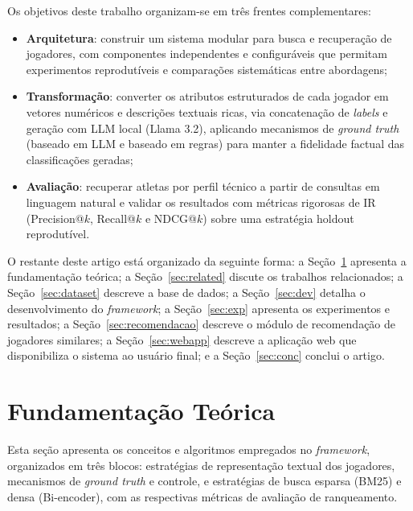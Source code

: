 \documentclass[portuguese]{sbc2025}
\begin{document}
Os objetivos deste trabalho organizam-se em três frentes complementares:

\begin{itemize}
  \item \textbf{Arquitetura}: construir um sistema modular para busca e recuperação
        de jogadores, com componentes independentes e configuráveis que permitam
        experimentos reprodutíveis e comparações sistemáticas entre abordagens;

  \item \textbf{Transformação}: converter os atributos estruturados de cada jogador
        em vetores numéricos e descrições textuais ricas, via concatenação de
        \textit{labels} e geração com LLM local (Llama 3.2), aplicando mecanismos
        de \textit{ground truth} (baseado em LLM e baseado em regras) para manter
        a fidelidade factual das classificações geradas;

  \item \textbf{Avaliação}: recuperar atletas por perfil técnico a partir de consultas
        em linguagem natural e validar os resultados com métricas rigorosas de IR
        (Precision@$k$, Recall@$k$ e NDCG@$k$) sobre uma estratégia
        holdout reprodutível.
\end{itemize}

O restante deste artigo está organizado da seguinte forma: a Seção~\ref{sec:fund}
apresenta a fundamentação teórica; a Seção~\ref{sec:related} discute os trabalhos
relacionados; a Seção~\ref{sec:dataset} descreve a base de dados; a
Seção~\ref{sec:dev} detalha o desenvolvimento do \textit{framework}; a
Seção~\ref{sec:exp} apresenta os experimentos e resultados; a
Seção~\ref{sec:recomendacao} descreve o módulo de recomendação de jogadores
similares; a Seção~\ref{sec:webapp} descreve a aplicação web que disponibiliza o
sistema ao usuário final; e a Seção~\ref{sec:conc} conclui o artigo.


\section{Fundamentação Teórica}
\label{sec:fund}

Esta seção apresenta os conceitos e algoritmos empregados no \textit{framework},
organizados em três blocos: estratégias de representação textual dos jogadores,
mecanismos de \textit{ground truth} e controle, e estratégias de busca esparsa
(BM25) e densa (Bi-encoder), com as respectivas métricas de avaliação de ranqueamento.
\end{document}
